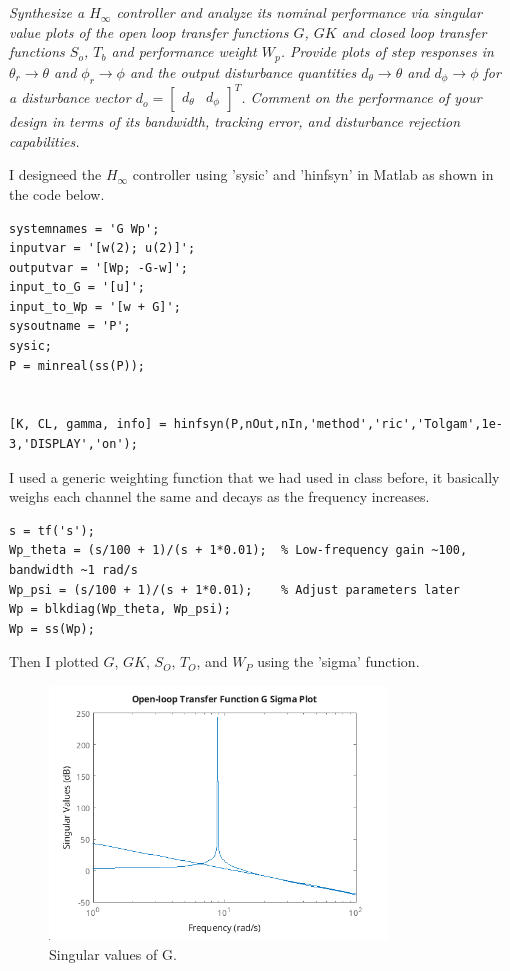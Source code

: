 \documentclass{article}
\begin{document}
\section{}
\textit{Synthesize a $H_{\infty}$ controller and analyze its nominal performance via singular value plots of the open loop transfer functions $G$, $G K$ and closed loop transfer functions $S_o$, $T_b$ and performance weight $W_p$. Provide plots of step responses in $\theta_r \to \theta$ and $\phi_r \to \phi$ and the output disturbance quantities $d_\theta \to \theta$ and $d_\phi \to \phi$ for a disturbance vector $d_o = \begin{bmatrix} d_\theta & d_\phi \end{bmatrix}^T$. Comment on the performance of your design in terms of its bandwidth, tracking error, and disturbance rejection capabilities.}

I designeed the $H_\infty$ controller using 'sysic' and 'hinfsyn' in Matlab as shown in the code below.

\begin{lstlisting}[style=matlabstyle]
systemnames = 'G Wp';
inputvar = '[w(2); u(2)]';
outputvar = '[Wp; -G-w]';
input_to_G = '[u]';
input_to_Wp = '[w + G]';
sysoutname = 'P';
sysic;
P = minreal(ss(P));


[K, CL, gamma, info] = hinfsyn(P,nOut,nIn,'method','ric','Tolgam',1e-3,'DISPLAY','on');        
\end{lstlisting}

I used a generic weighting function that we had used in class before, it basically weighs each channel the same and decays as the frequency increases.

\begin{lstlisting}[style=matlabstyle]
s = tf('s');
Wp_theta = (s/100 + 1)/(s + 1*0.01);  % Low-frequency gain ~100, bandwidth ~1 rad/s
Wp_psi = (s/100 + 1)/(s + 1*0.01);    % Adjust parameters later
Wp = blkdiag(Wp_theta, Wp_psi);
Wp = ss(Wp);    
\end{lstlisting}

Then I plotted $G$, $GK$, $S_O$, $T_O$, and $W_P$ using the 'sigma' function.

\begin{figure}
    \centering
    \includegraphics[width=0.8\textwidth]{sigmaG.png}
    \caption{Singular values of G.}
    \label{fig:sigmaG}
\end{figure}
\end{document}
